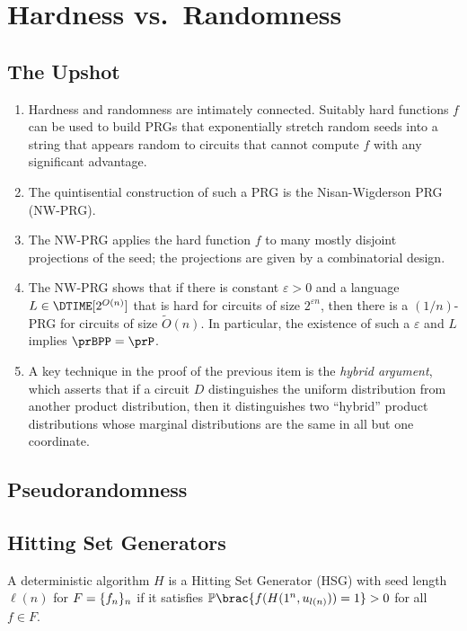\chapter{Hardness vs.\ Randomness}
\label{lec:02}

\section*{The Upshot}

\begin{enumerate}
  \item Hardness and randomness are intimately connected. Suitably hard
    functions $f$ can be used to build PRGs that exponentially stretch random
    seeds into a string that appears random to circuits that cannot compute $f$
    with any significant advantage.
  \item The quintisential construction of such a PRG is the Nisan-Wigderson PRG
    (NW-PRG).
  \item The NW-PRG applies the hard function $f$ to many mostly disjoint
    projections of the seed; the projections are given by a combinatorial
    design.
  \item The NW-PRG shows that if there is constant $\varepsilon > 0$ and a
    language $L \in \DTIME[2^{O(n)}]$ that is hard for circuits of size
    $2^{\varepsilon n}$, then there is a $(1/n)$-PRG for circuits of size
    $\widetilde{O}(n)$. In particular, the existence of such a $\varepsilon$ and
    $L$ implies $\prBPP = \prP$.
  \item A key technique in the proof of the previous item is the \emph{hybrid
    argument}, which asserts that if a circuit $D$ distinguishes the uniform
    distribution from another product distribution, then it distinguishes two
    ``hybrid'' product distributions whose marginal distributions are the same
    in all but one coordinate.
\end{enumerate}

\section{Pseudorandomness}

\section{Hitting Set Generators}

\begin{definition}
    A deterministic algorithm $H$ is a Hitting Set Generator (HSG) with seed length 
    $\ell(n)$ for $F = \{f_n\}_n$ if it satisfies $\Pr\brac{f(H(1^n, u_{l(n)})) = 
    1} > 0$ for all $f \in F$.
\end{definition}

